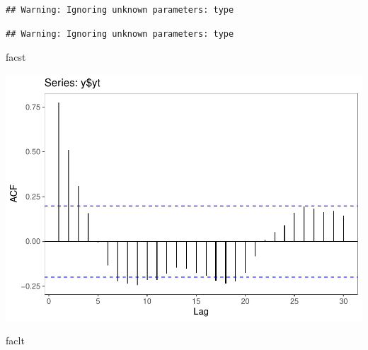 \documentclass[]{article}
\newenvironment{Shaded}{\begin{snugshade}}{\end{snugshade}}
\newcommand{\DataTypeTok}[1]{\textcolor[rgb]{0.13,0.29,0.53}{#1}}
\newcommand{\DecValTok}[1]{\textcolor[rgb]{0.00,0.00,0.81}{#1}}
\newcommand{\KeywordTok}[1]{\textcolor[rgb]{0.13,0.29,0.53}{\textbf{#1}}}
\newcommand{\NormalTok}[1]{#1}
\newcommand{\OperatorTok}[1]{\textcolor[rgb]{0.81,0.36,0.00}{\textbf{#1}}}
\newcommand{\StringTok}[1]{\textcolor[rgb]{0.31,0.60,0.02}{#1}}
\begin{document}
\begin{verbatim}
## Warning: Ignoring unknown parameters: type
\end{verbatim}

\begin{Shaded}
\end{Shaded}

\begin{verbatim}
## Warning: Ignoring unknown parameters: type
\end{verbatim}

\begin{Shaded}
\begin{Highlighting}[]
\NormalTok{facst}
\end{Highlighting}
\end{Shaded}

\includegraphics{Econo2_P5_files/figure-latex/plots fac facp-1.pdf}

\begin{Shaded}
\begin{Highlighting}[]
\NormalTok{faclt}
\end{Highlighting}
\end{Shaded}
\end{document}
